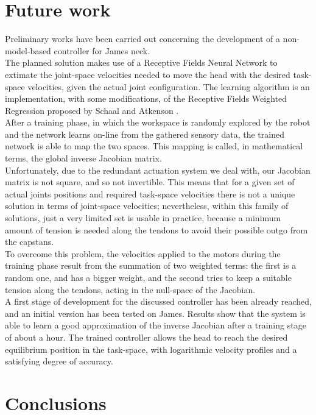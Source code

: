 \documentclass[9pt]{amsart}
\theoremstyle{definition}
\theoremstyle{remark}
\numberwithin{equation}{section}
\newcommand{\To}{\longrightarrow}
\newcommand{\A}{\mathcal{A}}
\begin{document}
\section{Future work} \label{Sec:FutureWork}

Preliminary works have been carried out concerning the development of a non-model-based controller for James neck.\\The planned solution makes use of a Receptive Fields Neural Network to extimate the joint-space velocities needed to move the head with the desired task-space velocities, given the actual joint configuration. The learning algorithm is an implementation, with some modifications, of the Receptive Fields Weighted Regression proposed by Schaal and Atkenson \cite{Schaal98rfwr}.\\After a training phase, in which the workspace is randomly explored by the robot and the network learns on-line from the gathered sensory data, the trained network is able to map the two spaces. This mapping is called, in mathematical terms, the global inverse Jacobian matrix.\\Unfortunately, due to the redundant actuation system we deal with, our Jacobian matrix is not square, and so not invertible. This means that for a given set of actual joints positions and required task-space velocities there is not a unique solution in terms of joint-space velocities; nevertheless, within this family of solutions, just a very limited set is usable in practice, because a minimum amount of tension is needed along the tendons to avoid their possible outgo from the capstans.\\To overcome this problem, the velocities applied to the motors during the training phase result from the summation of two weighted terms: the first is a random one, and has a bigger weight, and the second tries to keep a suitable tension along the tendons, acting in the null-space of the Jacobian.\\A first stage of development for the discussed controller has been already reached, and an initial version has been tested on James. Results show that the system is able to learn a good approximation of the inverse Jacobian after a training stage of about a hour. The trained controller allows the head to reach the desired equilibrium position in the task-space, with logarithmic velocity profiles and a satisfying degree of accuracy.


\section{Conclusions} \label{Sec:Conclusions}







\end{document}
